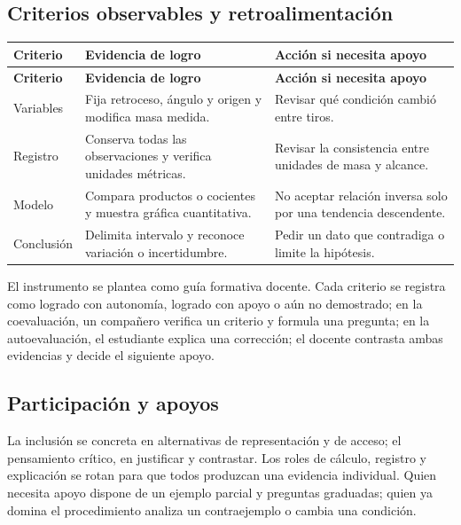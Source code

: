 \documentclass[spanish,letterpaper,oneside]{article}
\begin{document}
\subsection{Criterios observables y retroalimentación}

{\small{}\renewcommand{\arraystretch}{1.25}
\begin{longtable}{|>{\raggedright\arraybackslash}p{}|>{\raggedright\arraybackslash}p{}|>{\raggedright\arraybackslash}p{}|}\hline
\rowcolor{iiiepePale} \textbf{Criterio} & \textbf{Evidencia de logro} & \textbf{Acción si necesita apoyo} \\\hline
\endfirsthead
\hline
\rowcolor{iiiepePale} \textbf{Criterio} & \textbf{Evidencia de logro} & \textbf{Acción si necesita apoyo} \\\hline
\endhead
Variables & Fija retroceso, ángulo y origen y modifica masa medida. & Revisar qué condición cambió entre tiros. \\\hline
Registro & Conserva todas las observaciones y verifica unidades métricas. & Revisar la consistencia entre unidades de masa y alcance. \\\hline
Modelo & Compara productos o cocientes y muestra gráfica cuantitativa. & No aceptar relación inversa solo por una tendencia descendente. \\\hline
Conclusión & Delimita intervalo y reconoce variación o incertidumbre. & Pedir un dato que contradiga o limite la hipótesis. \\\hline
\end{longtable}}
El instrumento se plantea como guía formativa docente. Cada criterio se registra como logrado con autonomía, logrado con apoyo o aún no demostrado; en la coevaluación, un compañero verifica un criterio y formula una pregunta; en la autoevaluación, el estudiante explica una corrección; el docente contrasta ambas evidencias y decide el siguiente apoyo.\subsection{Participación y apoyos}
La inclusión se concreta en alternativas de representación y de acceso; el pensamiento crítico, en justificar y contrastar. Los roles de cálculo, registro y explicación se rotan para que todos produzcan una evidencia individual. Quien necesita apoyo dispone de un ejemplo parcial y preguntas graduadas; quien ya domina el procedimiento analiza un contraejemplo o cambia una condición.
\end{document}
